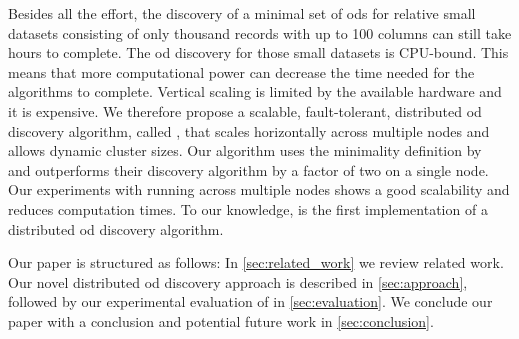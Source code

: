   Besides all the effort, the discovery of a minimal set of \glspl{od} for relative small datasets consisting of only thousand records with up to 100 columns can still take hours to complete.
  The \gls{od} discovery for those small datasets is CPU-bound.
  This means that more computational power can decrease the time needed for the algorithms to complete.
  Vertical scaling is limited by the available hardware and it is expensive.
  We therefore propose a scalable, fault-tolerant, distributed \gls{od} discovery algorithm, called \dodo{}, that scales horizontally across multiple nodes and allows dynamic cluster sizes.
  Our algorithm uses the minimality definition by \citeauthor{consonni}~\cite{consonni} and outperforms their discovery algorithm \ocddiscover{} by a factor of two on a single node.
  Our experiments with running \dodo{} across multiple nodes shows a good scalability and reduces computation times.
  To our knowledge, \dodo{} is the first implementation of a distributed \gls{od} discovery algorithm.

  Our paper is structured as follows:
  In \cref{sec:related_work} we review related work.
  Our novel distributed \gls{od} discovery approach \dodo{} is described in \cref{sec:approach}, followed by our experimental evaluation of \dodo{} in \cref{sec:evaluation}.
  We conclude our paper with a conclusion and potential future work in \cref{sec:conclusion}.
